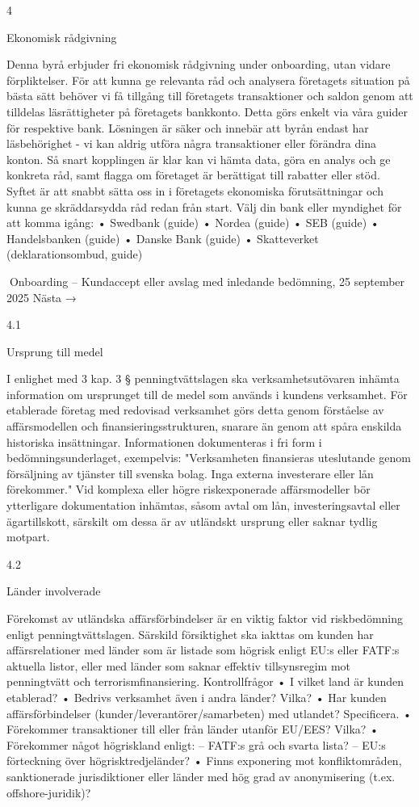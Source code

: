 4

Ekonomisk rådgivning

Denna byrå erbjuder fri ekonomisk rådgivning under onboarding, utan vidare förpliktelser.
För att kunna ge relevanta råd och analysera företagets situation på bästa sätt behöver
vi få tillgång till företagets transaktioner och saldon genom att tilldelas läsrättigheter på
företagets bankkonto.
Detta görs enkelt via våra guider för respektive bank. Lösningen är säker och innebär
att byrån endast har läsbehörighet - vi kan aldrig utföra några transaktioner eller förändra
dina konton. Så snart kopplingen är klar kan vi hämta data, göra en analys och ge konkreta
råd, samt flagga om företaget är berättigat till rabatter eller stöd.
Syftet är att snabbt sätta oss in i företagets ekonomiska förutsättningar och kunna ge
skräddarsydda råd redan från start.
Välj din bank eller myndighet för att komma igång:
• Swedbank (guide)
• Nordea (guide)
• SEB (guide)
• Handelsbanken (guide)
• Danske Bank (guide)
• Skatteverket (deklarationsombud, guide)

Onboarding – Kundaccept eller avslag med inledande bedömning,
25 september 2025
Nästa →

4.1

Ursprung till medel

I enlighet med 3 kap. 3 § penningtvättslagen ska verksamhetsutövaren inhämta information om ursprunget till de medel som används i kundens verksamhet. För etablerade
företag med redovisad verksamhet görs detta genom förståelse av affärsmodellen och finansieringsstrukturen, snarare än genom att spåra enskilda historiska insättningar.
Informationen dokumenteras i fri form i bedömningsunderlaget, exempelvis:
"Verksamheten finansieras uteslutande genom försäljning av tjänster till svenska bolag. Inga externa investerare eller lån förekommer."
Vid komplexa eller högre riskexponerade affärsmodeller bör ytterligare dokumentation
inhämtas, såsom avtal om lån, investeringsavtal eller ägartillskott, särskilt om dessa är av
utländskt ursprung eller saknar tydlig motpart.

4.2

Länder involverade

Förekomst av utländska affärsförbindelser är en viktig faktor vid riskbedömning enligt
penningtvättslagen. Särskild försiktighet ska iakttas om kunden har affärsrelationer med
länder som är listade som högrisk enligt EU:s eller FATF:s aktuella listor, eller med länder
som saknar effektiv tillsynsregim mot penningtvätt och terrorismfinansiering.
Kontrollfrågor
• I vilket land är kunden etablerad?
• Bedrivs verksamhet även i andra länder? Vilka?
• Har kunden affärsförbindelser (kunder/leverantörer/samarbeten) med utlandet? Specificera.
• Förekommer transaktioner till eller från länder utanför EU/EES? Vilka?
• Förekommer något högriskland enligt:
– FATF:s grå och svarta lista?
– EU:s förteckning över högrisktredjeländer?
• Finns exponering mot konfliktområden, sanktionerade jurisdiktioner eller länder med
hög grad av anonymisering (t.ex. offshore-juridik)?

